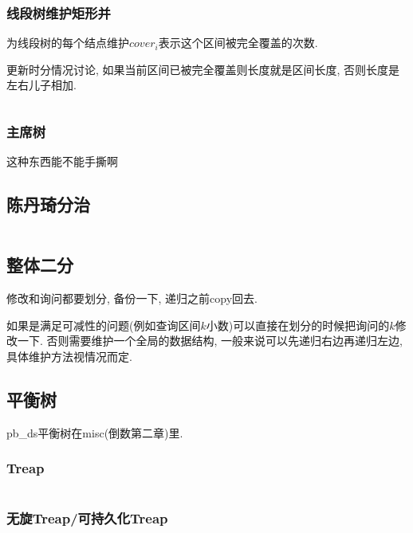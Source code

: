 \documentclass[a4paper]{article}
\begin{document}
\begin{multicols}{2}
				\subsubsection{线段树维护矩形并}
					为线段树的每个结点维护$cover_i$表示这个区间被完全覆盖的次数.

					更新时分情况讨论, 如果当前区间已被完全覆盖则长度就是区间长度, 否则长度是左右儿子相加.
					\inputminted{cpp}{../src/datastructure/线段树维护矩形并.cpp}

				\subsubsection{主席树}
					这种东西能不能手撕啊
	
			\subsection{陈丹琦分治}
				\inputminted{cpp}{../src/datastructure/CDQ分治.cpp}
	
			\subsection{整体二分}
				修改和询问都要划分, 备份一下, 递归之前copy回去.

				如果是满足可减性的问题(例如查询区间$k$小数)可以直接在划分的时候把询问的$k$修改一下. 否则需要维护一个全局的数据结构, 一般来说可以先递归右边再递归左边, 具体维护方法视情况而定.

	
	
			\subsection{平衡树}
				pb\_ds平衡树在misc(倒数第二章)里.

				\subsubsection{Treap}
					\inputminted{cpp}{../src/datastructure/Treap.cpp}
					
				\subsubsection{无旋Treap/可持久化Treap}
					\inputminted{cpp}{../src/datastructure/无旋Treap.cpp}
		

\end{multicols}
\end{document}
